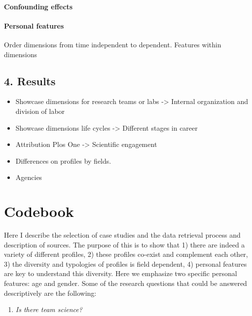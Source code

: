 \documentclass[]{article}
\providecommand{\tightlist}{%
  \setlength{\itemsep}{0pt}\setlength{\parskip}{0pt}}
\let\oldparagraph\paragraph
\renewcommand{\paragraph}[1]{\oldparagraph{#1}\mbox{}}
\begin{document}
\paragraph{Confounding effects}\label{confounding-effects}

\paragraph{Personal features}\label{personal-features}

Order dimensions from time independent to dependent. Features within
dimensions

\subsection{4. Results}\label{results}

\begin{itemize}
\tightlist
\item
  Showcase dimensions for research teams or labs -\textgreater{}
  Internal organization and division of labor
\item
  Showcase dimensions life cycles -\textgreater{} Different stages in
  career
\item
  Attribution Plos One -\textgreater{} Scientific engagement
\item
  Differences on profiles by fields.
\item
  Agencies
\end{itemize}

\pagebreak

\section{Codebook}\label{codebook}

Here I describe the selection of case studies and the data retrieval
process and description of sources. The purpose of this is to show that
1) there are indeed a variety of different profiles, 2) these profiles
co-exist and complement each other, 3) the diversity and typologies of
profiles is field dependent, 4) personal features are key to understand
this diversity. Here we emphasize two specific personal features: age
and gender. Some of the research questions that could be answered
descriptively are the following:

\begin{enumerate}
\def\labelenumi{\arabic{enumi}.}
\tightlist
\item
  \emph{Is there team science?}
\end{enumerate}
\end{document}
